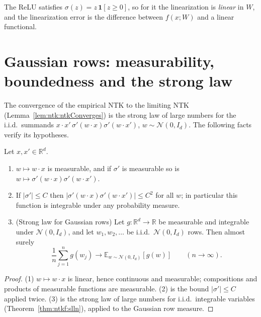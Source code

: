 The ReLU satisfies $\sigma(z)=z\,\mathbf 1[z\ge0]$, so for it the linearization is \emph{linear} in $W$, and the linearization error is the difference between $f(x;W)$ and a linear functional.


\section{Gaussian rows: measurability, boundedness and the strong law}\label{sec:ntkhelp:rows}

The convergence of the empirical NTK to the limiting NTK (Lemma~\ref{lem:ntk:ntkConverges}) is the strong law of large numbers for the i.i.d.\ summands $x\cdot x'\,\sigma'(w\cdot x)\sigma'(w\cdot x')$, $w\sim\mathcal N(0,I_d)$. The following facts verify its hypotheses.

\begin{lemma}\label{lem:ntkhelp:slln}
  \leanok
Let $x,x'\in\mathbb R^d$.
\begin{enumerate}
  \item $w\mapsto w\cdot x$ is measurable, and if $\sigma'$ is measurable so is $w\mapsto\sigma'(w\cdot x)\sigma'(w\cdot x')$.
  \item If $|\sigma'|\le C$ then $|\sigma'(w\cdot x)\sigma'(w\cdot x')|\le C^2$ for all $w$; in particular this function is integrable under any probability measure.
  \item (Strong law for Gaussian rows) Let $g:\mathbb R^d\to\mathbb R$ be measurable and integrable under $\mathcal N(0,I_d)$, and let $w_1,w_2,\dots$ be i.i.d.\ $\mathcal N(0,I_d)$ rows. Then almost surely
  \[
    \frac1n\sum_{j=1}^ng(w_j)\longrightarrow\mathbb E_{w\sim\mathcal N(0,I_d)}[g(w)]\qquad(n\to\infty).
  \]
\end{enumerate}
\end{lemma}

\begin{proof}
  \leanok
(1) $w\mapsto w\cdot x$ is linear, hence continuous and measurable; compositions and products of measurable functions are measurable. (2) is the bound $|\sigma'|\le C$ applied twice. (3) is the strong law of large numbers for i.i.d.\ integrable variables (Theorem~\ref{thm:ntkf:slln}), applied to the Gaussian row measure.
\end{proof}

